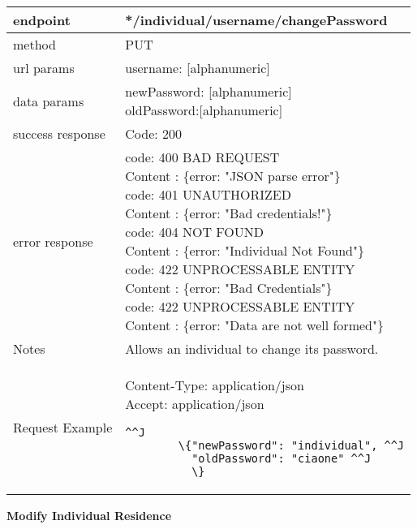 \begin{tabularx}{\linewidth}{| l| l }
	\hline
	endpoint & */individual/{username}/changePassword \\
	\hline
	method & PUT \\
	\hline
	url params & 
	\parbox{0.7\textwidth}{
		\bigskip
		username: [alphanumeric]
		\bigskip
	}\\
	\hline
	data params & 
	\parbox{0.7\textwidth}{
		\bigskip
		newPassword: [alphanumeric]\\
		oldPassword:[alphanumeric]
		\bigskip
	} \\
	\hline
	success response &
	\parbox{0.7\textwidth}{
		\bigskip
		Code: 200
		\bigskip
	} \\
	\hline
	error response &
	\parbox{0.7\textwidth}{
		\bigskip
		code: 400 BAD REQUEST \\
		Content : \{error: "JSON parse error"\}\\
		code: 401 UNAUTHORIZED \\
		Content : \{error: "Bad credentials!"\}\\
		code: 404 NOT FOUND \\
		Content : \{error: "Individual Not Found"\}\\
		code: 422 UNPROCESSABLE ENTITY\\
		Content : \{error: "Bad Credentials"\}\\
		code: 422 UNPROCESSABLE ENTITY\\
		Content : \{error: "Data are not well formed"\}
		\bigskip
	} \\
	\hline
	Notes & \parbox{0.7\textwidth}{
		\bigskip
		Allows an individual to change its password.
		\bigskip
	} \\
	\hline
	Request Example & 
		\parbox{0.8\textwidth}{
		\bigskip
		Content-Type: application/json \\
		Accept: application/json \\
		\bigskip
		\begin{lstlisting}^^J
		\{"newPassword": "individual", ^^J
		  "oldPassword": "ciaone" ^^J
		  \}
		\end{lstlisting}
	} \\
		\hline
\end{tabularx}

\textbf{Modify Individual Residence}\\


